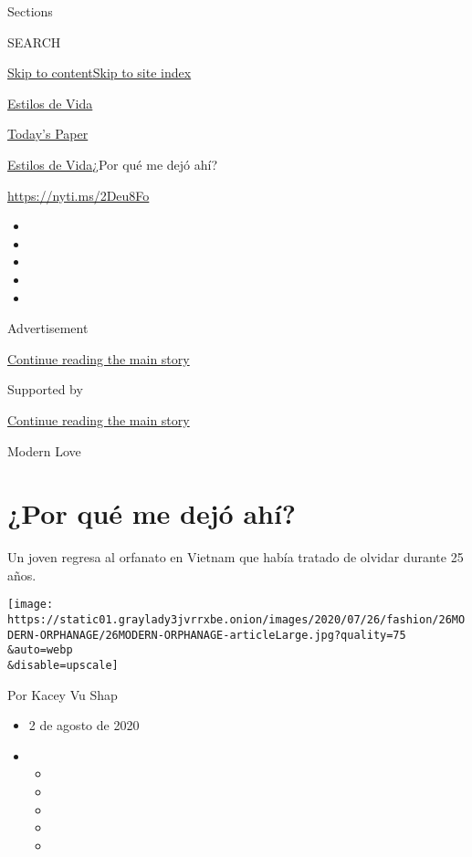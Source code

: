 Sections

SEARCH

\protect\hyperlink{site-content}{Skip to
content}\protect\hyperlink{site-index}{Skip to site index}

\href{https://www.nytimes3xbfgragh.onion/es/section/estilos-de-vida}{Estilos
de Vida}

\href{https://myaccount.nytimes3xbfgragh.onion/auth/login?response_type=cookie\&client_id=vi}{}

\href{https://www.nytimes3xbfgragh.onion/section/todayspaper}{Today's
Paper}

\href{/es/section/estilos-de-vida}{Estilos de Vida}\textbar{}¿Por qué me
dejó ahí?

\url{https://nyti.ms/2Deu8Fo}

\begin{itemize}
\item
\item
\item
\item
\item
\end{itemize}

Advertisement

\protect\hyperlink{after-top}{Continue reading the main story}

Supported by

\protect\hyperlink{after-sponsor}{Continue reading the main story}

Modern Love

\hypertarget{por-quuxe9-me-dejuxf3-ahuxed}{%
\section{¿Por qué me dejó ahí?}\label{por-quuxe9-me-dejuxf3-ahuxed}}

Un joven regresa al orfanato en Vietnam que había tratado de olvidar
durante 25 años.

\texttt{[image: https://static01.graylady3jvrrxbe.onion/images/2020/07/26/fashion/26MODERN-ORPHANAGE/26MODERN-ORPHANAGE-articleLarge.jpg?quality=75\\\&auto=webp\\\&disable=upscale]}

Por Kacey Vu Shap

\begin{itemize}
\item
  2 de agosto de 2020
\item
  \begin{itemize}
  \item
  \item
  \item
  \item
  \item
  \end{itemize}
\end{itemize}

